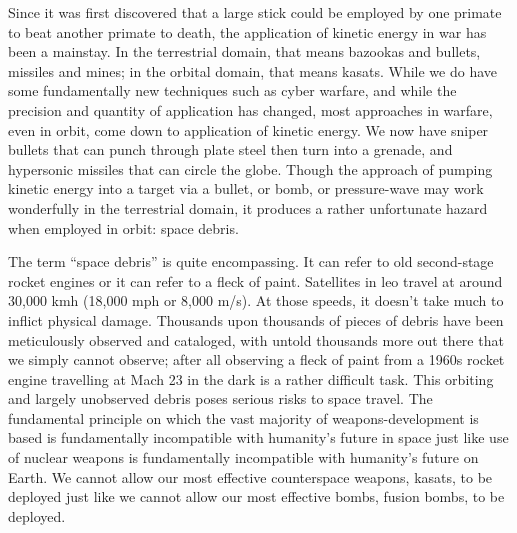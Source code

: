 {}

\titlenote{}

\maketitle

\pagestyle{theRest}
\thispagestyle{firstPage}

Since it was first discovered that a large stick could be employed by
one primate to beat another primate to death, the application of
kinetic energy in war has been a mainstay.  In the terrestrial domain,
that means bazookas and bullets, missiles and mines; in the orbital
domain, that means \acp{kasat}.  While we do have some fundamentally
new techniques such as cyber warfare\cite{big-risks}, and while the
precision and quantity of application has changed, most approaches in
warfare, even in orbit, come down to application of kinetic
energy.\cite{brian} We now have sniper bullets that can punch through
plate steel then turn into a grenade\cite[fancy sniper bullets]{xxx},
and hypersonic missiles that can circle the globe.\cite[chinese
  hypersonic]{xxx} Though the approach of pumping kinetic energy into
a target via a bullet, or bomb, or pressure-wave may work wonderfully
in the terrestrial domain, it produces a rather unfortunate hazard
when employed in orbit: space debris.

The term ``space debris'' is quite encompassing.  It can refer to old
second-stage rocket engines\cite[just about anything]{xxx} or it can
refer to a fleck of paint\cite[iss window]{xxx}.  Satellites in
\ac{leo} travel at around 30,000 kmh (18,000 mph or 8,000
m/s).\cite[hyperphysics]{xxx} At those speeds, it doesn't take much to
inflict physical damage.  Thousands upon thousands of pieces of debris
have been meticulously observed and cataloged, with untold thousands
more out there that we simply cannot observe; after all observing a
fleck of paint from a 1960s rocket engine travelling at Mach 23 in the
dark is a rather difficult task.  This orbiting and largely unobserved
debris poses serious risks to space travel.  The fundamental principle
on which the vast majority of weapons-development is based is
fundamentally incompatible with humanity's future in space just like
use of nuclear weapons is fundamentally incompatible with humanity's
future on Earth.  We cannot allow our most effective counterspace
weapons, \acp{kasat}, to be deployed just like we cannot allow our
most effective bombs, fusion bombs, to be deployed.


